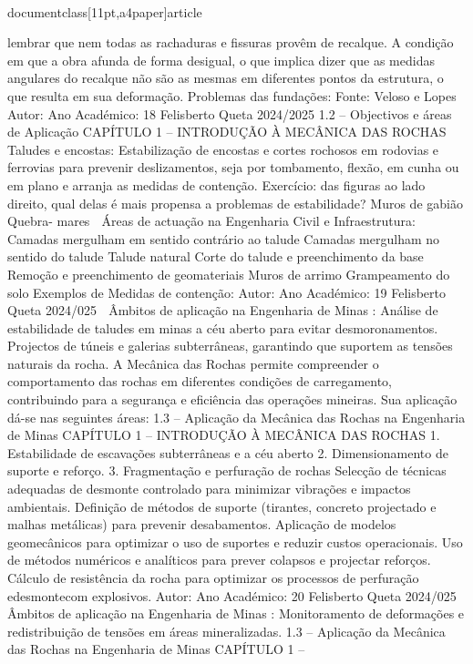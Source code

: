 \\documentclass[11pt,a4paper]{article}
\begin{document}
lembrar que nem todas as rachaduras e 
fissuras provêm de recalque.
A condição em que a obra 
afunda de forma desigual, 
o que implica dizer que as 
medidas angulares do 
recalque não são as 
mesmas em diferentes 
pontos da estrutura, o que 
resulta em sua 
deformação.
Problemas das fundações:
Fonte: Veloso e Lopes
Autor:
Ano Académico:
18
Felisberto Queta
2024/2025
1.2 – Objectivos e áreas de Aplicação
CAPÍTULO 1 
–
 INTRODUÇÃO À MECÂNICA DAS ROCHAS
Taludes e encostas:
Estabilização de encostas e cortes rochosos em rodovias e ferrovias para prevenir
deslizamentos, seja por tombamento, flexão, em cunha ou em plano e arranja as medidas de
contenção.
Exercício: das figuras ao lado direito,
qual delas é mais propensa a problemas
de estabilidade?
Muros
de
gabião
Quebra-
mares
 Áreas de actuação na Engenharia Civil e Infraestrutura:
Camadas mergulham em
sentido contrário ao talude
Camadas mergulham no
sentido do talude
Talude natural
Corte do talude e
preenchimento da base
Remoção e preenchimento
de geomateriais
Muros
de
arrimo
Grampeamento
do solo
Exemplos de
Medidas de
contenção:
Autor:
Ano Académico:
19
Felisberto Queta
2024/025

 Âmbitos de aplicação na Engenharia de Minas
:
Análise de estabilidade de taludes em minas a céu aberto para evitar
desmoronamentos.
Projectos de túneis e galerias subterrâneas, garantindo que suportem as 
tensões naturais da rocha.
A Mecânica das Rochas permite compreender o comportamento das rochas em diferentes condições de carregamento, 
contribuindo para a segurança e eficiência das operações mineiras. Sua aplicação dá-se nas seguintes áreas:
1.3 – Aplicação da Mecânica das Rochas na Engenharia de Minas
CAPÍTULO 1 
–
 INTRODUÇÃO À MECÂNICA DAS ROCHAS
1. Estabilidade de escavações subterrâneas e 
a céu aberto
2. Dimensionamento de suporte e reforço.
3. Fragmentação e perfuração de rochas Selecção de técnicas adequadas de desmonte controlado para minimizar 
vibrações e impactos ambientais.
Definição de métodos de suporte (tirantes, concreto projectado e malhas
metálicas) para prevenir desabamentos.
Aplicação de modelos geomecânicos para optimizar o uso de suportes e 
reduzir custos operacionais.
Uso de métodos numéricos e analíticos para prever colapsos e projectar
reforços.
Cálculo de resistência da rocha para optimizar os processos de 
perfuração edesmontecom explosivos.
Autor:
Ano Académico:
20
Felisberto Queta
2024/025

 Âmbitos de aplicação na Engenharia de Minas
:
Monitoramento de deformações e redistribuição de tensões em áreas 
mineralizadas.
1.3 – Aplicação da Mecânica das Rochas na Engenharia de Minas
CAPÍTULO 1 
–
\end{document}
